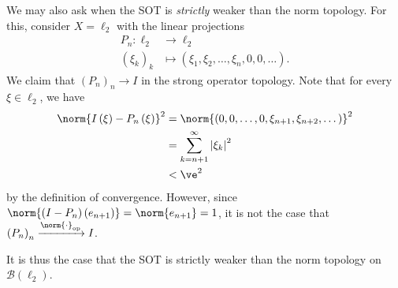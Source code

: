 \documentclass[10pt]{mypackage}
\begin{document}
\begin{example}
  We may also ask when the SOT is \textit{strictly} weaker than the norm topology. For this, consider $X = \ell_2$ with the linear projections
  \begin{align*}
    P_n: \ell_2 &\rightarrow \ell_2\\
    \left(\xi_k\right)_k &\mapsto \left(\xi_1,\xi_2,\dots,\xi_n,0,0,\dots\right).
  \end{align*}
  We claim that $\left(P_n\right)_n\rightarrow I$ in the strong operator topology. Note that for every $\xi\in \ell_2$, we have
  \begin{align*}
    \norm{I\left(\xi\right) - P_n\left(\xi\right)}^2 &= \norm{\left(0,0,\dots,0,\xi_{n+1},\xi_{n+2},\dots\right)}^2\\
                                                     &= \sum_{k = n+1}^{\infty}\left\vert \xi_k \right\vert^2\\
                                                     & < \ve^2
  \end{align*}
  by the definition of convergence. However, since $\norm{\left(I-P_n\right)\left(e_{n+1}\right)} = \norm{e_{n+1}} = 1$, it is not the case that $\left(P_n\right)_n\xrightarrow{\norm{\cdot}_{\text{op}}}I$.\newline

  It is thus the case that the SOT is strictly weaker than the norm topology on $\mathcal{B}\left(\ell_2\right)$.
\end{example}
\end{document}
